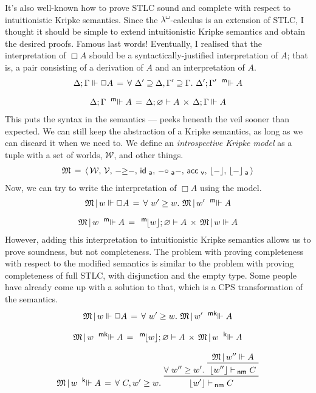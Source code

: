 \documentclass{entcs}
\newcommand{\lambdabox}{\lambda^{\mkern-1mu\sq\mkern-2mu}}
\newcommand{\binop}[1]{-\mathord{#1}-}
\newcommand{\tsf}[1]{\textsf{\upshape{#1}}}
\newcommand{\stsf}[1]{\tsf{\small{#1}}}
\renewcommand{\:}{\mathrel{:}}
\renewcommand{\;}{\mathbin{;}}
\let\oldforall\forall
\renewcommand{\forall}{\oldforall\,}
\newcommand{\0}{\varnothing}
\renewcommand{\geq}{\mathrel{\supseteq}}
\newcommand{\sq}{\Box}
\renewcommand{\e}{\mathrel{\vdash}}
\newcommand{\enm}{\mathrel{\vdash_{\mkern-2mu\stsf{nm}}}}
\newcommand{\M}{\mathfrak{M}}
\newcommand{\W}{\mathcal{W}}
\newcommand{\V}{\mathcal{V}}
\newcommand{\ida}{\operatorname{\tsf{id}_{\stsf{a}}}}
\newcommand{\compa}{\mathrel{\circ_{\stsf{a}}}}
\newcommand{\accv}{\operatorname{\tsf{acc}_{\stsf{v}}}}
\newcommand{\peek}[1]{\mathopen{\lfloor}{#1}\mathclose{\rfloor}}
\newcommand{\peeka}[1]{\mathopen{\lfloor}{#1}\mathclose{\rfloor_{\mkern-2mu\stsf{a}}}}
\newcommand{\mpeek}[1]{\mathopen{^{\stsf{m}\mkern-3mu}\lfloor}{#1}\mathclose{\rfloor}}
\newcommand{\ee}{\mathrel{\Vdash}}
\newcommand{\kee}{\mathrel{^{\stsf{k}\mkern-6mu}\Vdash}}
\newcommand{\mee}{\mathrel{^{\stsf{m}\mkern-6mu}\Vdash}}
\newcommand{\mkee}{\mathrel{^{\stsf{mk}\mkern-6mu}\Vdash}}
\begin{document}
It's also well-known how to prove STLC sound and complete with respect to intuitionistic Kripke semantics.  Since the $\lambdabox$-calculus is an extension of STLC, I thought it should be simple to extend intuitionistic Kripke semantics and obtain the desired proofs.  Famous last words!  Eventually, I realised that the interpretation of $\sq A$ should be a syntactically-justified interpretation of $A$; that is, a pair consisting of a derivation of $A$ and an interpretation of $A$.
\begin{gather*}
  \Delta; \Gamma \ee \sq A\,=\,\forall \Delta' \geq \Delta, \Gamma' \geq \Gamma.\ \Delta'; \Gamma' \mee A\\[0.5\baselineskip]
  \Delta; \Gamma \mee A\,=\,\Delta; \0 \e A\,\times\,\Delta; \Gamma \ee A
\end{gather*}
This puts the syntax in the semantics --- peeks beneath the veil sooner than expected.  We can still keep the abstraction of a Kripke semantics, as long as we can discard it when we need to.  We define an \emph{introspective Kripke model} as a tuple with a set of worlds, $\W$, and other things.
\begin{gather*}
  \M\,=\,\langle\,\W,\,\V,\,\binop{\ge},\,\ida,\,\binop{\compa},\,\accv,\,\peek{-},\,\peeka{-}\,\rangle
\end{gather*}
Now, we can try to write the interpretation of $\sq A$ using the model.
\begin{gather*}
  \M\,|\,w \ee \sq A\,=\,\forall w' \ge w.\ \M\,|\,w' \mee A\\[0.5\baselineskip]
  \M\,|\,w \mee A\,=\,\mpeek{w}; \0 \e A\,\times\,\M\,|\,w \ee A
\end{gather*}
However, adding this interpretation to intuitionistic Kripke semantics allows us to prove soundness, but not completeness.  The problem with proving completeness with respect to the modified semantics is similar to the problem with proving completeness of full STLC, with disjunction and the empty type.  Some people have already come up with a solution to that, which is a CPS transformation of the semantics.
\begin{gather*}
  \M\,|\,w \ee \sq A\,=\,\forall w' \ge w.\ \M\,|\,w' \mkee A\\[0.5\baselineskip]
  \M\,|\,w \mkee A\,=\,\mpeek{w}; \0 \e A\,\times\,\M\,|\,w \kee A\\[0.5\baselineskip]
  \M\,|\,w \kee A\,=\,\forall C, w' \ge w.\ \prftree{\forall w'' \ge w'.\ \prftree{\M\,|\,w'' \ee A}{\lfloor w'' \rfloor \enm C}}{\lfloor w' \rfloor \enm C}
\end{gather*}
\end{document}
